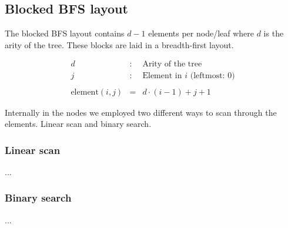 
\subsection{Blocked BFS layout}

The blocked BFS layout contains $d - 1$ elements per node/leaf where $d$ is the arity of the tree. These blocks are laid in a breadth-first layout.

\begin{eqnarray*}
d & : & \textrm{Arity of the tree} \\
j & : & \textrm{Element in $i$ (leftmost: $0$)} \\
\\
\mathrm{element}(i, j) & = & d\cdot (i - 1) + j + 1
\end{eqnarray*}


Internally in the nodes we employed two different ways to scan through the elements. Linear scan and binary search.


\subsubsection{Linear scan}

...

\subsubsection{Binary search}

...